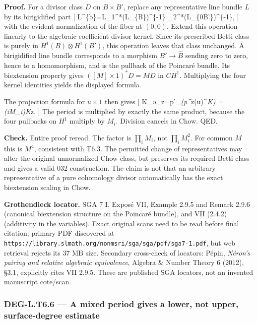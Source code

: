 \documentclass[11pt,a4paper]{article}
\theoremstyle{definition}
\begin{document}
\textbf{Proof.} For a divisor class \(D\) on \(B\times B'\), replace any
representative line bundle \(L\) by its birigidified part {[}
L\^{}\{\mathrm b\}=L\otimes{}\_1\^{}*(L\textbar\_\{B\})\^{}\{-1\}
\otimes{}\_2\^{}*(L\textbar\_\{0\times B'\})\^{}\{-1\},
{]} with the evident normalization of the fiber at \((0,0)\). Extend
this operation linearly to the algebraic-coefficient divisor kernel.
Since its prescribed Betti class is purely in \(H^1(B)\otimes H^1(B')\),
this operation leaves that class unchanged. A birigidified line bundle
corresponds to a morphism \(B'\to\widehat B\) sending zero to zero,
hence to a homomorphism, and is the pullback of the Poincaré bundle. Its
biextension property gives \(([M]\times1)^*D=M D\) in \(CH^1\).
Multiplying the four kernel identities yields the displayed formula.

The projection formula for \(u\times1\) then gives {[}
K\_\emph{u\_}z=p'\_\emph{\bigl(p\^{}}z\cdot(u)\^{}\emph{K\bigr)
=\Bigl(\prod\emph{iM\_i\Bigr)K}}z. {]} The period is multiplied by
exactly the same product, because the four pullbacks on \(H^1\) multiply
by \(M_i\). Division cancels in Chow. QED.

\textbf{Check.} Entire proof reread. The factor is \(\prod_iM_i\), not
\(\prod_iM_i^2\). For common \(M\) this is \(M^4\), consistent with
T6.3. The permitted change of representatives may alter the original
unnormalized Chow class, but preserves its required Betti class and
gives a valid 032 construction. The claim is not that an arbitrary
representative of a pure cohomology divisor automatically has the exact
biextension scaling in Chow.

\textbf{Grothendieck locator.} SGA 7 I, Exposé VII, Example 2.9.5 and
Remark 2.9.6 (canonical biextension structure on the Poincaré bundle),
and VII (2.4.2) (additivity in the variables). Exact original scans need
to be read before final citation; primary PDF discovered at
\texttt{https://library.slmath.org/nonmsri/sga/sga/pdf/sga7-1.pdf}, but
web retrieval rejects its 37 MB size. Secondary cross-check of locators:
Pépin, \emph{Néron's pairing and relative algebraic equivalence},
Algebra \& Number Theory 6 (2012), §3.1, explicitly cites VII 2.9.5.
These are published SGA locators, not an invented manuscript cote/scan.

\subsubsection{DEG-L.T6.6 --- A mixed period gives a lower, not upper,
surface-degree
estimate}\label{deg-l.t6.6-a-mixed-period-gives-a-lower-not-upper-surface-degree-estimate}
\end{document}
